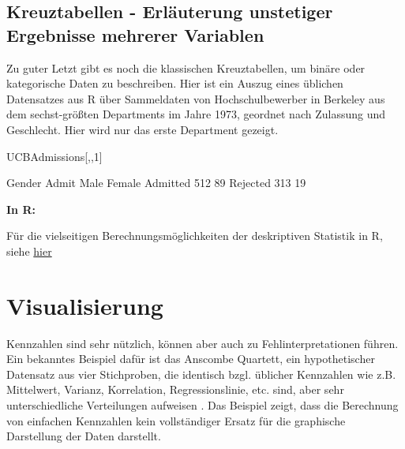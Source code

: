 \documentclass[a4paper,twoside]{tufte-book}\usepackage[]{graphicx}\usepackage[]{color}
\begin{document}
\subsection{Kreuztabellen - Erläuterung unstetiger Ergebnisse mehrerer Variablen}

Zu guter Letzt gibt es noch die klassischen Kreuztabellen, um binäre oder kategorische Daten zu beschreiben. Hier ist ein Auszug eines üblichen Datensatzes aus R über Sammeldaten von Hochschulbewerber in Berkeley aus dem sechst-größten Departments im Jahre 1973, geordnet nach Zulassung und Geschlecht. Hier wird nur das erste Department gezeigt.

\begin{Schunk}
\begin{Sinput}
UCBAdmissions[,,1]
\end{Sinput}
\begin{Soutput}
          Gender
Admit      Male Female
  Admitted  512     89
  Rejected  313     19
\end{Soutput}
\end{Schunk}


\vspace{1cm}
\begin{fullwidth}
\begin{mdframed}
    
\textbf{In R:} 

Für die vielseitigen Berechnungsmöglichkeiten der deskriptiven Statistik in R, siehe \href{http://www.uni-kiel.de/psychologie/rexrepos/rerDescriptive.html}{hier}

\end{mdframed}
\end{fullwidth} 


\section{Visualisierung}


Kennzahlen sind sehr nützlich, können aber auch zu Fehlinterpretationen führen. Ein bekanntes Beispiel dafür ist das Anscombe Quartett, ein hypothetischer Datensatz aus vier Stichproben, die identisch bzgl. üblicher Kennzahlen wie z.B. Mittelwert, Varianz, Korrelation, Regressionslinie, etc. sind, aber sehr unterschiedliche Verteilungen aufweisen \citep{Anscombe-Graphsinstatistical-1973}. Das Beispiel zeigt, dass die Berechnung von einfachen Kennzahlen kein vollständiger Ersatz für die graphische Darstellung der Daten darstellt.
\end{document}
